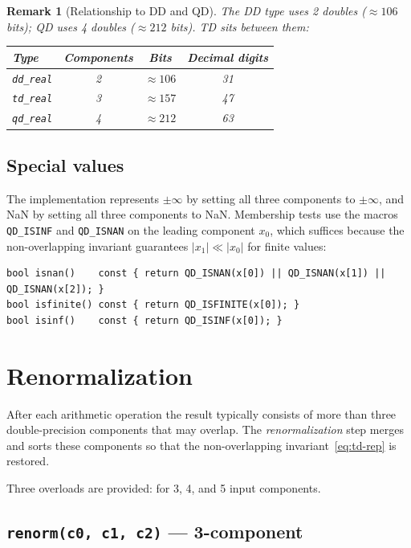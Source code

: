 \documentclass[11pt,a4paper]{article}
\newtheorem{remark}{Remark}
\begin{document}
\begin{remark}[Relationship to DD and QD]
The DD type uses 2 doubles ($\approx 106$ bits); QD uses 4 doubles
($\approx 212$ bits).  TD sits between them:
\begin{center}
\begin{tabular}{lccc}
\toprule
Type & Components & Bits & Decimal digits \\
\midrule
\texttt{dd\_real} & 2 & $\approx 106$ & 31 \\
\texttt{td\_real} & 3 & $\approx 157$ & 47 \\
\texttt{qd\_real} & 4 & $\approx 212$ & 63 \\
\bottomrule
\end{tabular}
\end{center}
\end{remark}

\subsection{Special values}

The implementation represents $\pm\infty$ by setting all three
components to $\pm\infty$, and NaN by setting all three components to
NaN.  Membership tests use the macros \texttt{QD\_ISINF} and
\texttt{QD\_ISNAN} on the leading component $x_0$, which suffices
because the non-overlapping invariant guarantees $|x_1| \ll |x_0|$
for finite values:
\begin{lstlisting}
bool isnan()    const { return QD_ISNAN(x[0]) || QD_ISNAN(x[1]) || QD_ISNAN(x[2]); }
bool isfinite() const { return QD_ISFINITE(x[0]); }
bool isinf()    const { return QD_ISINF(x[0]); }
\end{lstlisting}


\section{Renormalization}
\label{sec:renorm}

After each arithmetic operation the result typically consists of more
than three double-precision components that may overlap.  The
\emph{renormalization} step merges and sorts these components so that
the non-overlapping invariant~\eqref{eq:td-rep} is restored.

Three overloads are provided: for 3, 4, and 5 input components.

\subsection{\texttt{renorm(c0, c1, c2)} --- 3-component}
\end{document}
